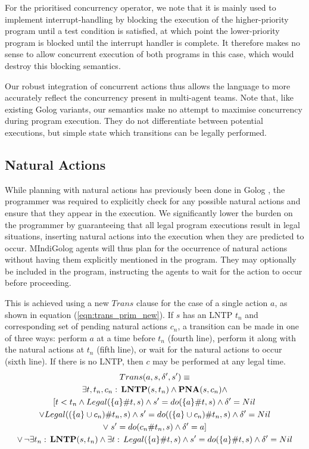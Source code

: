 For the prioritised concurrency operator, we note that it is mainly
used to implement interrupt-handling by blocking the execution of
the higher-priority program until a test condition is satisfied, at
which point the lower-priority program is blocked until the interrupt
handler is complete. It therefore makes no sense to allow concurrent
execution of both programs in this case, which would destroy this
blocking semantics.

Our robust integration of concurrent actions thus allows the language
to more accurately reflect the concurrency present in multi-agent
teams. Note that, like existing Golog variants, our semantics make
no attempt to maximise concurrency during program execution. They
do not differentiate between potential executions, but simple state
which transitions can be legally performed.


\subsection{Natural Actions}

While planning with natural actions has previously been done in Golog
\citep{pirri00planning_nat_acts}, the programmer was required to
explicitly check for any possible natural actions and ensure that
they appear in the execution. We significantly lower the burden on
the programmer by guaranteeing that all legal program executions result
in legal situations, inserting natural actions into the execution
when they are predicted to occur. MIndiGolog agents will thus plan
for the occurrence of natural actions without having them explicitly
mentioned in the program. They may optionally be included in the program,
instructing the agents to wait for the action to occur before proceeding.

This is achieved using a new $Trans$ clause for the case of a single
action $a$, as shown in equation (\ref{eqn:trans_prim_new}). If
$s$ has an LNTP $t_{n}$ and corresponding set of pending natural
actions $c_{n}$, a transition can be made in one of three ways: perform
$a$ at a time before $t_{n}$ (fourth line), perform it along with
the natural actions at $t_{n}$ (fifth line), or wait for the natural
actions to occur (sixth line). If there is no LNTP, then $c$ may
be performed at any legal time.\begin{multline}
Trans(a,s,\delta',s')\equiv\\
\exists t,t_{n},c_{n}:\,\mathbf{LNTP}(s,t_{n})\wedge\mathbf{PNA}(s,c_{n})\wedge\\
\left[t<t_{n}\wedge Legal(\{a\}\#t,s)\wedge s'=do(\{a\}\#t,s)\wedge\delta'=Nil\right.\\
\vee Legal((\{a\}\cup c_{n})\#t_{n},s)\wedge s'=do((\{a\}\cup c_{n})\#t_{n},s)\wedge\delta'=Nil\\
\vee\left.s'=do(c_{n}\#t_{n},s)\wedge\delta'=a\right]\\
\vee\,\neg\exists t_{n}:\,\mathbf{LNTP}(s,t_{n})\wedge\exists t:\, Legal(\{a\}\#t,s)\wedge s'=do(\{a\}\#t,s)\wedge\delta'=Nil\label{eqn:trans_prim_new}\end{multline}


